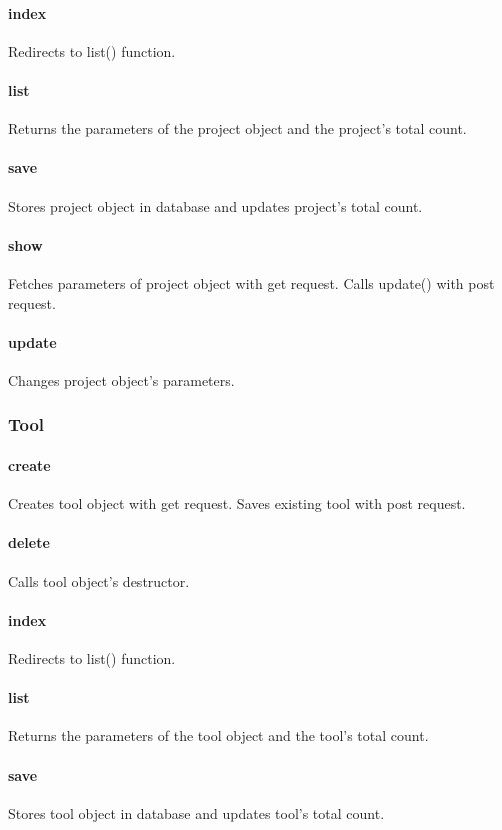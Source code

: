 \documentclass[12pt]{article}
\begin{document}
\paragraph{index} Redirects to list() function.
\paragraph{list} Returns the parameters of the project object and the project's total count.
\paragraph{save} Stores project object in database and updates project's total count.
\paragraph{show} Fetches parameters of project object with get request. Calls update() with post request.
\paragraph{update} Changes project object's parameters.

\subsubsection{Tool}\label{sec:CTool}
\paragraph{create} Creates tool object with get request. Saves existing tool with post request.
\paragraph{delete} Calls tool object's destructor.
\paragraph{index} Redirects to list() function.
\paragraph{list} Returns the parameters of the tool object and the tool's total count.
\paragraph{save} Stores tool object in database and updates tool's total count.
\end{document}
